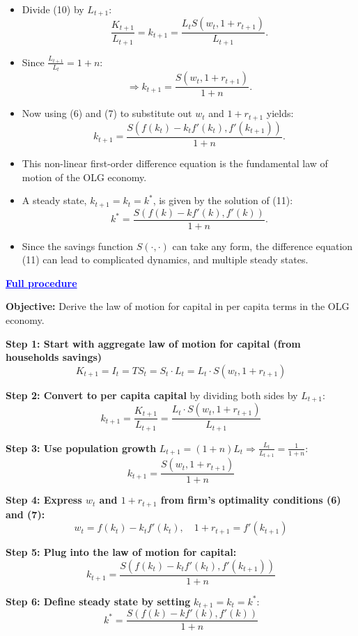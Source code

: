 \documentclass[12pt]{article}
\begin{document}
\begin{itemize}
    \item Divide (10) by $L_{t+1}$:
    \[
    \frac{K_{t+1}}{L_{t+1}} = k_{t+1} = \frac{L_t S(w_t, 1 + r_{t+1})}{L_{t+1}}.
    \]
    
    \item Since $\frac{L_{t+1}}{L_t} = 1 + n$:
    \[
    \Rightarrow k_{t+1} = \frac{S(w_t, 1 + r_{t+1})}{1 + n}.
    \]

    \item Now using (6) and (7) to substitute out $w_t$ and $1 + r_{t+1}$ yields:
    \[
    k_{t+1} = \frac{S\left(f(k_t) - k_t f'(k_t), f'(k_{t+1})\right)}{1 + n}. \tag{11}
    \]
    
    \item This non-linear first-order difference equation is the fundamental law of motion of the OLG economy.
    
    \item A steady state, $k_{t+1} = k_t = k^*$, is given by the solution of (11):
    \[
    k^* = \frac{S\left(f(k) - k f'(k), f'(k)\right)}{1 + n}.
    \]
    
    \item Since the savings function $S(\cdot, \cdot)$ can take any form, the difference equation (11) can lead to complicated dynamics, and multiple steady states.
\end{itemize}

\textcolor{blue}{\textbf{\uline{Full procedure}}}

{\color{blue}
\textbf{Objective:} Derive the law of motion for capital in per capita terms in the OLG economy.

\vspace{1em}

\textbf{Step 1: Start with aggregate law of motion for capital (from households savings)}
\[
K_{t+1} = I_t = T S_t = S_t \cdot L_t = L_t \cdot S(w_t, 1 + r_{t+1})
\]

\textbf{Step 2: Convert to per capita capital} by dividing both sides by $L_{t+1}$:
\[
k_{t+1} = \frac{K_{t+1}}{L_{t+1}} = \frac{L_t \cdot S(w_t, 1 + r_{t+1})}{L_{t+1}}
\]

\textbf{Step 3: Use population growth} $L_{t+1} = (1 + n)L_t \Rightarrow \frac{L_t}{L_{t+1}} = \frac{1}{1 + n}$:
\[
k_{t+1} = \frac{S(w_t, 1 + r_{t+1})}{1 + n}
\]

\textbf{Step 4: Express $w_t$ and $1 + r_{t+1}$ from firm's optimality conditions (6) and (7):}
\[
w_t = f(k_t) - k_t f'(k_t), \quad 1 + r_{t+1} = f'(k_{t+1})
\]

\textbf{Step 5: Plug into the law of motion for capital:}
\[
k_{t+1} = \frac{S\left(f(k_t) - k_t f'(k_t), f'(k_{t+1})\right)}{1 + n}
\]

\textbf{Step 6: Define steady state by setting } $k_{t+1} = k_t = k^*$:
\[
k^* = \frac{S\left(f(k) - k f'(k), f'(k)\right)}{1 + n}
\]
}
\end{document}
